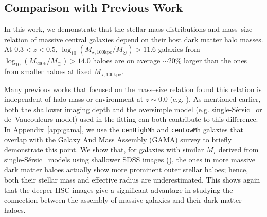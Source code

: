 \documentclass[a4paper,fleqn,usenatbib]{mnras}
\def\ser{{S\'{e}rsic\ }}
\def\rbcg{\texttt{cenHighMh}}
\def\nbcg{\texttt{cenLowMh}}
\def\mstar{{$M_{\star}$}}
\def\logmhalo{{$\log_{10} (M_{\mathrm{200b}}/M_{\odot})$}}
\def\mtot{{$M_{\star,100\mathrm{kpc}}$}}
\def\logmtot{{$\log_{10} (M_{\star,100\mathrm{kpc}}/M_{\odot})$}}
\begin{document}

\subsection{Comparison with Previous Work} 

    In this work, we demonstrate that the stellar mass distributions and mass--size 
    relation of massive central galaxies depend on their host dark matter halo masses. 
    At $0.3 < z < 0.5$, \logmtot{}$>11.6$ galaxies from \logmhalo{}$>14.0$ haloes 
    are on average $\sim20$\% larger than the ones from smaller haloes at fixed 
    \mtot{}.
    
    Many previous works that focused on the mass--size relation found this relation 
    is independent of halo mass or environment at $z\sim 0.0$ 
    (e.g. \citealt{Nair2010, Maltby2010, Cappellari2013, HCompany13}). 
    As mentioned earlier, both the shallower imaging depth and the oversimple model 
    (e.g. single-\ser{} or de~Vaucouleurs model) used in the fitting can both 
    contribute to this difference.
    In Appendix~\ref{app:gama}, we use the \rbcg{} and \nbcg{} galaxies that overlap 
    with the Galaxy And Mass Assembly (GAMA) survey to briefly demonstrate this point. 
    We show that, for galaxies with similar \mstar{} derived from single-\ser{} 
    models using shallower SDSS images (\citealt{Kelvin2012}), the ones in more 
    massive dark matter haloes actually show more prominent outer stellar haloes; 
    hence, both their stellar mass and effective radius are underestimated.  
    This shows again that the deeper HSC images give a significant advantage in 
    studying the connection between the assembly of massive galaxies and their dark 
    matter haloes. 
    
\end{document}
